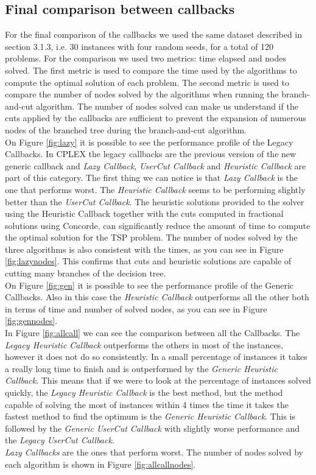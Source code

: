 \subsection{Final comparison between callbacks}
For the final comparison of the callbacks we used the same dataset described in section 3.1.3, i.e. 30 instances with four random seeds, for a total of 120 problems.
For the comparison we used two metrics: time elapsed and nodes solved. The first metric is used to compare the time used by the algorithms to compute the optimal solution of each problem. The second metric is used to compare the number of nodes solved by the algorithms when running the branch-and-cut algorithm. The number of nodes solved can make us understand if the cuts applied by the callbacks are sufficient to prevent the expansion of numerous nodes of the branched tree during the branch-and-cut algorithm. \\
On Figure \ref{fig:lazy} it is possible to see the performance profile of the Legacy Callbacks. In CPLEX the legacy callbacks are the previous version of the new generic callback and \textit{Lazy Callback}, \textit{UserCut Callback} and \textit{Heuristic Callback} are part of this category. The first thing we can notice is that \textit{Lazy Callback} is the one that performs worst. The \textit{Heuristic Callback} seems to be performing slightly better than the \textit{UserCut Callback}. The heuristic solutions provided to the solver using the Heuristic Callback together with the cuts computed in fractional solutions using Concorde, can significantly reduce the amount of time to compute the optimal solution for the TSP problem. The number of nodes solved by the three algorithms is also consistent with the times, as you can see in Figure \ref{fig:lazynodes}. This confirms that cuts and heuristic solutions are capable of cutting many branches of the decision tree. \\
On Figure \ref{fig:gen} it is possible to see the performance profile of the Generic Callbacks. Also in this case the \textit{Heuristic Callback} outperforms all the other both in terms of time and number of solved nodes, as you can see in Figure \ref{fig:gennodes}. \\
In Figure \ref{fig:allcall} we can see the comparison between all the Callbacks. The \textit{Legacy Heuristic Callback} outperforms the others in most of the instances, however it does not do so consistently. In a small percentage of instances it takes a really long time to finish and is outperformed by the \textit{Generic Heuristic Callback}. This means that if we were to look at the percentage of instances solved quickly, the \textit{Legacy Heuristic Callback} is the best method, but the method capable of solving the most of instances within 4 times the time it takes the fastest method to find the optimum is the \textit{Generic Heuristic Callback}. This is followed by the \textit{Generic UserCut Callback} with slightly worse performance and the \textit{Legacy UserCut Callback}.\\ \textit{Lazy Callbacks} are the ones that perform worst. The number of nodes solved by each algorithm is shown in Figure \ref{fig:allcallnodes}. \\
